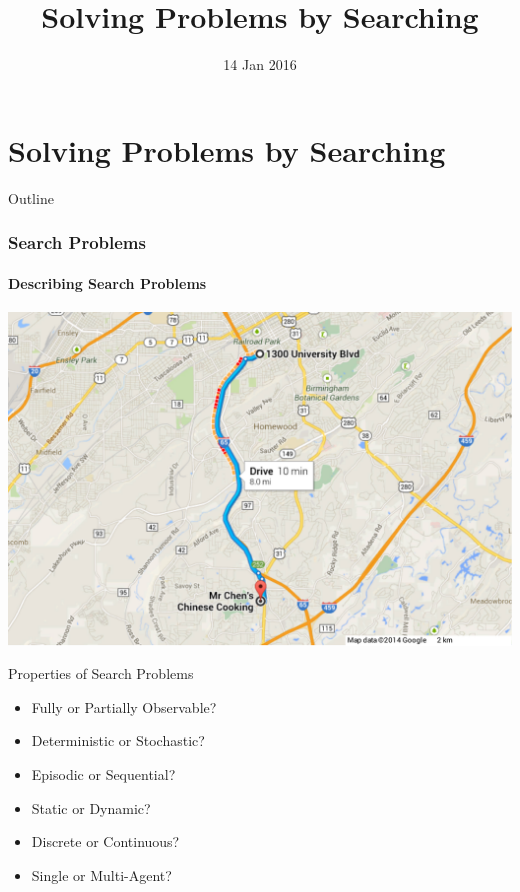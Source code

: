 \documentclass[14pt]{beamer}
\title{Solving Problems by Searching}
\date[]{14 Jan 2016}
\begin{document}
\begin{frame}
  \titlepage
\end{frame}

\part{Solving Problems by Searching}

\begin{frame}{Outline}
\tableofcontents
\end{frame}

\section{Search Problems}

\subsection{Describing Search Problems}
\begin{frame}[plain]
	\begin{center}
		\includegraphics[width=\textwidth]{uab-to-mr-chens.pdf}
	\end{center}
\end{frame}

\begin{frame}{Properties of Search Problems}
	\begin{itemize}
		\item \alert<2->{Fully} or Partially Observable?
		\item \alert<3->{Deterministic} or Stochastic?
		\item Episodic or \alert<4->{Sequential}?
		\item \alert<5->{Static} or Dynamic?
		\item \alert<6->{Discrete} or Continuous?
		\item \alert<7->{Single} or Multi-Agent?
	\end{itemize}
\end{frame}
\end{document}
